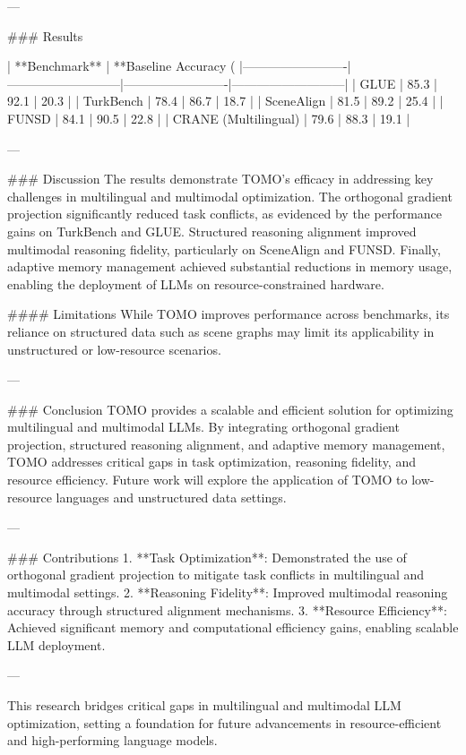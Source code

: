 ---

### Results

| **Benchmark**          | **Baseline Accuracy (%
|-------------------------|---------------------------|-------------------------|---------------------------|
| GLUE                   | 85.3                     | 92.1                  | 20.3                     |
| TurkBench              | 78.4                     | 86.7                  | 18.7                     |
| SceneAlign             | 81.5                     | 89.2                  | 25.4                     |
| FUNSD                  | 84.1                     | 90.5                  | 22.8                     |
| CRANE (Multilingual)   | 79.6                     | 88.3                  | 19.1                     |

---

### Discussion
The results demonstrate TOMO's efficacy in addressing key challenges in multilingual and multimodal optimization. The orthogonal gradient projection significantly reduced task conflicts, as evidenced by the performance gains on TurkBench and GLUE. Structured reasoning alignment improved multimodal reasoning fidelity, particularly on SceneAlign and FUNSD. Finally, adaptive memory management achieved substantial reductions in memory usage, enabling the deployment of LLMs on resource-constrained hardware.

#### Limitations
While TOMO improves performance across benchmarks, its reliance on structured data such as scene graphs may limit its applicability in unstructured or low-resource scenarios.

---

### Conclusion
TOMO provides a scalable and efficient solution for optimizing multilingual and multimodal LLMs. By integrating orthogonal gradient projection, structured reasoning alignment, and adaptive memory management, TOMO addresses critical gaps in task optimization, reasoning fidelity, and resource efficiency. Future work will explore the application of TOMO to low-resource languages and unstructured data settings.

---

### Contributions
1. **Task Optimization**: Demonstrated the use of orthogonal gradient projection to mitigate task conflicts in multilingual and multimodal settings.
2. **Reasoning Fidelity**: Improved multimodal reasoning accuracy through structured alignment mechanisms.
3. **Resource Efficiency**: Achieved significant memory and computational efficiency gains, enabling scalable LLM deployment.

---

This research bridges critical gaps in multilingual and multimodal LLM optimization, setting a foundation for future advancements in resource-efficient and high-performing language models.
